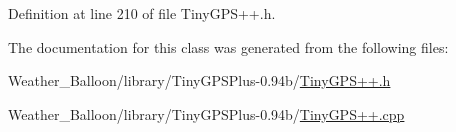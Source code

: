 Definition at line 210 of file Tiny\+G\+P\+S++.\+h.



The documentation for this class was generated from the following files\+:\begin{DoxyCompactItemize}
\item 
Weather\+\_\+\+Balloon/library/\+Tiny\+G\+P\+S\+Plus-\/0.\+94b/\hyperlink{_tiny_g_p_s_09_09_8h}{Tiny\+G\+P\+S++.\+h}\item 
Weather\+\_\+\+Balloon/library/\+Tiny\+G\+P\+S\+Plus-\/0.\+94b/\hyperlink{_tiny_g_p_s_09_09_8cpp}{Tiny\+G\+P\+S++.\+cpp}\end{DoxyCompactItemize}
